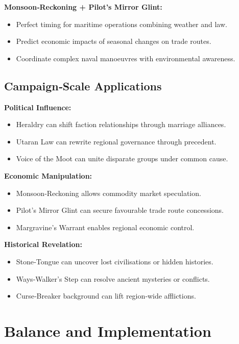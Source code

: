\textbf{Monsoon‑Reckoning + Pilot's Mirror Glint:}
\begin{itemize}
    \item Perfect timing for maritime operations combining weather and law.
    \item Predict economic impacts of seasonal changes on trade routes.
    \item Coordinate complex naval manoeuvres with environmental awareness.
\end{itemize}

\subsection{Campaign‑Scale Applications}\label{subsec:campaign_scale}

\textbf{Political Influence:}
\begin{itemize}
    \item Heraldry can shift faction relationships through marriage alliances.
    \item Utaran Law can rewrite regional governance through precedent.
    \item Voice of the Moot can unite disparate groups under common cause.
\end{itemize}

\textbf{Economic Manipulation:}
\begin{itemize}
    \item Monsoon‑Reckoning allows commodity market speculation.
    \item Pilot's Mirror Glint can secure favourable trade route concessions.
    \item Margravine's Warrant enables regional economic control.
\end{itemize}

\textbf{Historical Revelation:}
\begin{itemize}
    \item Stone‑Tongue can uncover lost civilisations or hidden histories.
    \item Ways‑Walker's Step can resolve ancient mysteries or conflicts.
    \item Curse‑Breaker background can lift region‑wide afflictions.
\end{itemize}

\section{Balance and Implementation}\label{sec:balance_implementation}

